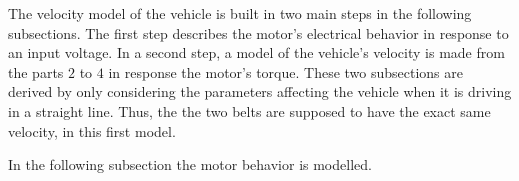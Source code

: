The velocity model of the vehicle is built in two main steps in the following subsections. The first step describes the motor's electrical behavior in response to an input voltage. In a second step, a model of the vehicle's velocity is made from the parts $2$ to $4$ in response the motor's torque. These two subsections are derived by only considering the parameters affecting the vehicle when it is driving in a straight line. Thus, the the two belts are supposed to have the exact same velocity, in this first model.

In the following subsection the motor behavior is modelled.